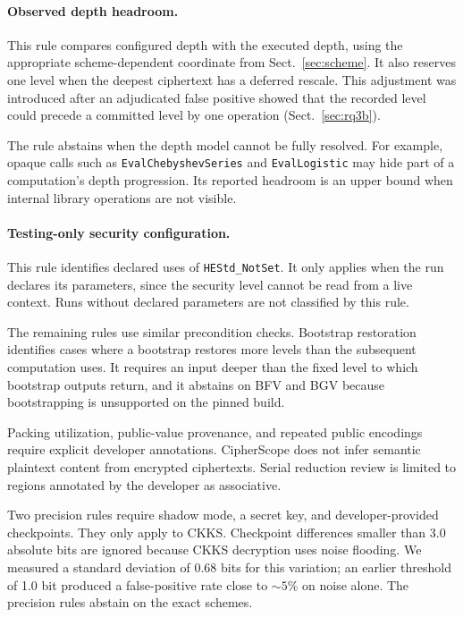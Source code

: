 \documentclass[pdflatex,sn-basic,Numbered,iicol]{sn-jnl}
\begin{document}
\paragraph{Observed depth headroom.} This rule compares configured depth with
the executed depth, using the appropriate scheme-dependent coordinate from
Sect.~\ref{sec:scheme}. It also reserves one level when the deepest ciphertext
has a deferred rescale. This adjustment was introduced after an adjudicated
false positive showed that the recorded level could precede a committed level
by one operation (Sect.~\ref{sec:rq3b}).

The rule abstains when the depth model cannot be fully resolved. For example,
opaque calls such as \texttt{EvalChebyshevSeries} and
\texttt{EvalLogistic} may hide part of a computation's depth progression. Its
reported headroom is an upper bound when internal library operations are not
visible.

\paragraph{Testing-only security configuration.} This rule identifies
declared uses of \texttt{HEStd\_NotSet}. It only applies when the run
declares its parameters, since the security level cannot be read from a live
context. Runs without declared parameters are not classified by this rule.

The remaining rules use similar precondition checks. Bootstrap restoration
identifies cases where a bootstrap restores more levels than the subsequent
computation uses. It requires an input deeper than the fixed level to which
bootstrap outputs return, and it abstains on BFV and BGV because
bootstrapping is unsupported on the pinned build.

Packing utilization, public-value provenance, and repeated public encodings
require explicit developer annotations. CipherScope does not infer semantic
plaintext content from encrypted ciphertexts. Serial reduction review is
limited to regions annotated by the developer as associative.

Two precision rules require shadow mode, a secret key, and developer-provided
checkpoints. They only apply to CKKS. Checkpoint differences smaller than 3.0
absolute bits are ignored because CKKS decryption uses noise flooding. We
measured a standard deviation of 0.68 bits for this variation; an earlier
threshold of 1.0 bit produced a false-positive rate close to ${\sim}5\%$ on
noise alone. The precision rules abstain on the exact schemes.
\end{document}
